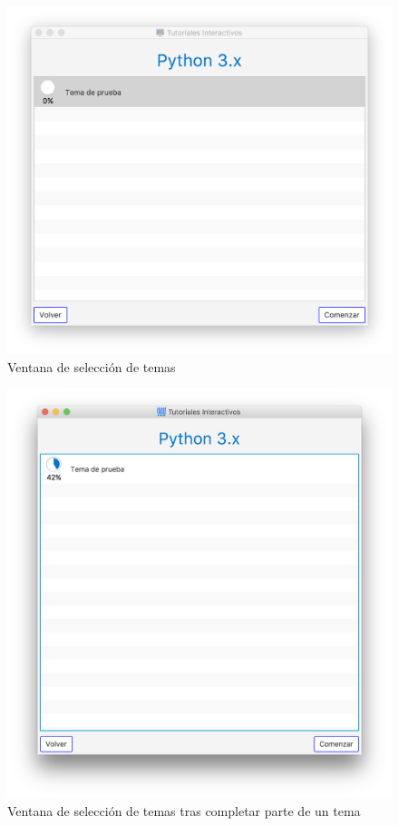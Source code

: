 \documentclass[]{article}
\begin{document}
%
\begin{figure}[tbp]
\begin{center}
\includegraphics[scale=0.35]{ng_2.png}
\end{center}
\caption{Ventana de selección de temas\label{fig:ng_2}}
\end{figure}
%

%
\begin{figure}[tbp]
\begin{center}
\includegraphics[scale=0.35]{ng_3.png}
\end{center}
\caption{Ventana de selección de temas tras completar parte de un tema\label{fig:ng_3}}
\end{figure}
%
\end{document}
